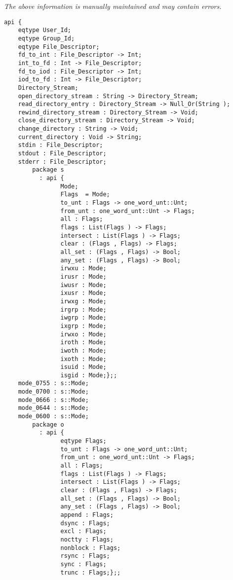 \label{api:Posix\_File}

{\tiny \it The above information is manually maintained and may contain errors.}
\begin{verbatim}
api {
    eqtype User_Id;
    eqtype Group_Id;
    eqtype File_Descriptor;
    fd_to_int : File_Descriptor -> Int;
    int_to_fd : Int -> File_Descriptor;
    fd_to_iod : File_Descriptor -> Int;
    iod_to_fd : Int -> File_Descriptor;
    Directory_Stream;
    open_directory_stream : String -> Directory_Stream;
    read_directory_entry : Directory_Stream -> Null_Or(String );
    rewind_directory_stream : Directory_Stream -> Void;
    close_directory_stream : Directory_Stream -> Void;
    change_directory : String -> Void;
    current_directory : Void -> String;
    stdin : File_Descriptor;
    stdout : File_Descriptor;
    stderr : File_Descriptor;
        package s
          : api {
                Mode;
                Flags  = Mode;
                to_unt : Flags -> one_word_unt::Unt;
                from_unt : one_word_unt::Unt -> Flags;
                all : Flags;
                flags : List(Flags ) -> Flags;
                intersect : List(Flags ) -> Flags;
                clear : (Flags , Flags) -> Flags;
                all_set : (Flags , Flags) -> Bool;
                any_set : (Flags , Flags) -> Bool;
                irwxu : Mode;
                irusr : Mode;
                iwusr : Mode;
                ixusr : Mode;
                irwxg : Mode;
                irgrp : Mode;
                iwgrp : Mode;
                ixgrp : Mode;
                irwxo : Mode;
                iroth : Mode;
                iwoth : Mode;
                ixoth : Mode;
                isuid : Mode;
                isgid : Mode;};;
    mode_0755 : s::Mode;
    mode_0700 : s::Mode;
    mode_0666 : s::Mode;
    mode_0644 : s::Mode;
    mode_0600 : s::Mode;
        package o
          : api {
                eqtype Flags;
                to_unt : Flags -> one_word_unt::Unt;
                from_unt : one_word_unt::Unt -> Flags;
                all : Flags;
                flags : List(Flags ) -> Flags;
                intersect : List(Flags ) -> Flags;
                clear : (Flags , Flags) -> Flags;
                all_set : (Flags , Flags) -> Bool;
                any_set : (Flags , Flags) -> Bool;
                append : Flags;
                dsync : Flags;
                excl : Flags;
                noctty : Flags;
                nonblock : Flags;
                rsync : Flags;
                sync : Flags;
                trunc : Flags;};;

\end{verbatim}
